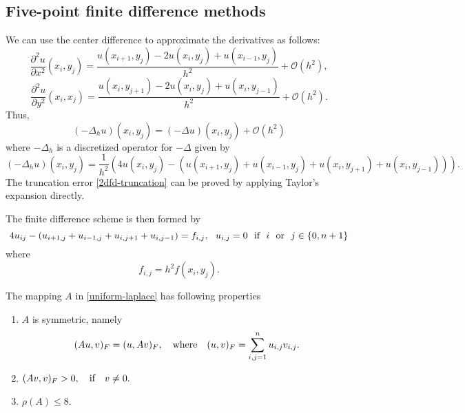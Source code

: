 \subsection{Five-point finite difference methods}
We can use the center difference to approximate the derivatives as follows:
$$
\frac{\partial^2 u}{\partial x^2}(x_i,y_j)=
\frac{u(x_{i+1},y_j)-2u(x_i,y_j)+u(x_{i-1},y_j)}{h^2}+{\mathcal O}(h^2),
$$
$$
\frac{\partial^2 u}{\partial y^2}(x_i,x_j)=
\frac{u(x_{i},y_{j+1})-2u(x_i,y_j)+u(x_{i},y_{j-1})}{h^2}+{\mathcal
 O}(h^2). 
$$
Thus, 
\begin{equation}\label{2dfd-truncation}
(-\Delta_hu)(x_i,y_j)=(-\Delta u)(x_i,y_j)+{\mathcal O}(h^2)
\end{equation}
where $-\Delta_h$ is a discretized operator for $-\Delta$ given by 
\begin{equation}
  \label{Delta-h}
(-\Delta_hu)(x_i,y_j)= \frac{1}{h^2}(4u(x_i,y_j)-(u(x_{i+1},y_j)+u(x_{i-1},y_j)
+u(x_i,y_{j+1})+u(x_i,y_{j-1}))).
\end{equation}
The truncation error \eqref{2dfd-truncation} can be proved by applying Taylor's expansion directly.

The finite difference scheme is then formed by
\begin{equation}
  \label{2d-fd0}
4u_{ij}-(u_{i+1,j}+u_{i-1,j}+u_{i,j+1}+u_{i,j-1})=f_{i,j},~~u_{i,j}=0~~\hbox{if}~~i ~~\hbox{or}~~ j\in \{0, n+1\}
\end{equation}
where 
\begin{equation}
  \label{fij-fd}
f_{i,j} =h^2 f(x_i, y_j).
\end{equation}

\begin{proposition}
The mapping $A$ in \eqref{uniform-laplace} has following properties
\begin{enumerate}
\item $A$ is symmetric, namely 
$$
(Au, v)_F=(u,Av)_F, ~~~\hbox{where}~~~ (u,v)_F=\sum_{i,j=1}^nu_{i,j}v_{i,j}.
$$
\item  $(Av, v)_F>0, ~~~\hbox{if}~~~v\neq 0.$
\item  $\rho(A)\le 8$.
\end{enumerate}
\end{proposition}

